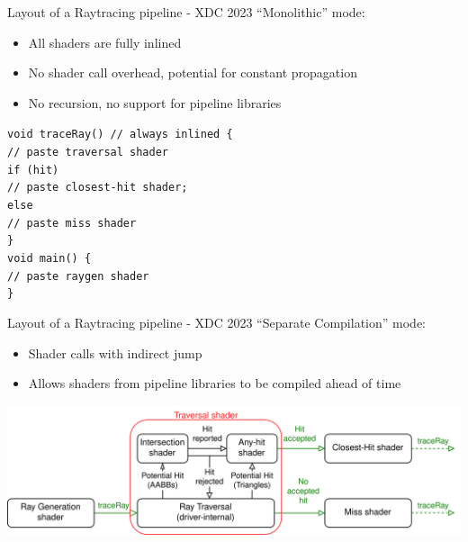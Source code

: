 \documentclass[aspectratio=169,t]{beamer}
\begin{document}
\begin{slide}{Layout of a Raytracing pipeline - XDC 2023}
 ``Monolithic'' mode:
 \begin{itemize}
  \item All shaders are fully inlined
  \item No shader call overhead, potential for constant propagation
  \item No recursion, no support for pipeline libraries
 \end{itemize}
  \texttt{void traceRay() // always inlined \{ \\
  \hspace*{8pt}// paste traversal shader \\
  \hspace*{8pt}if (hit) \\
  \hspace*{16pt}// paste closest-hit shader; \\
  \hspace*{8pt}else \\
  \hspace*{16pt}// paste miss shader \\
  \}} \\
  \texttt{void main() \{ \\
  \hspace*{8pt}// paste raygen shader \\
  \}} \\
\end{slide}

\begin{slide}{Layout of a Raytracing pipeline - XDC 2023}
 ``Separate Compilation'' mode:
 \begin{itemize}
  \item Shader calls with indirect jump
  \item Allows shaders from pipeline libraries to be compiled ahead of time
 \end{itemize}

 \includegraphics[width=1.0651\linewidth]{graphics/RTStages10.png}

\end{slide}
\end{document}
